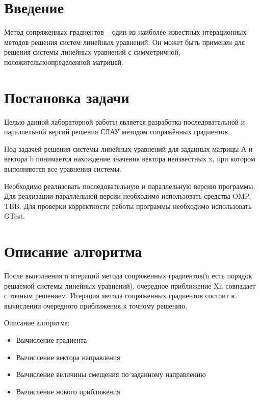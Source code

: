 \documentclass{report}
\begin{document}
 \setcounter{page}{2}

 \tableofcontents
 \newpage

 \section*{Введение}
 Метод сопряженных градиентов – один из наиболее известных итерационных методов решения систем линейных уравнений. Он может быть применен для решения системы линейных уравнений с симметричной, положительноопределенной матрицей.
 \newpage

 \section*{Постановка задачи}
 Целью данной лабораторной работы является разработка последовательной и параллельной версий решения СЛАУ методом сопряжённых градиентов. 
 \par Под задачей решения системы линейных уравнений для заданных матрицы А и вектора b понимается нахождение значения вектора неизвестных x, при котором выполняются все уравнения системы.
 \par Необходимо реализовать последовательную и параллельную версию программы. Для реализации параллельной версии необходимо использовать средства OMP, TBB. Для проверки корректности работы программы необходимо использовать GTest.
 \newpage

 \section*{Описание алгоритма}
 После выполнения n итераций метода сопряженных градиентов(n есть порядок решаемой системы линейных уравнений), очередное приближение Xn совпадает с точным решением. Итерация метода сопряженных градиентов состоит в вычислении очередного приближения к точному решению.
 \par Описание алгоритма:
 \begin{itemize}
 \item Вычисление градиента
 \item Вычисление вектора направления
 \item Вычисление величины смещения по заданному направлению
 \item Вычисление нового приближения
 \end{itemize}
\end{document}
